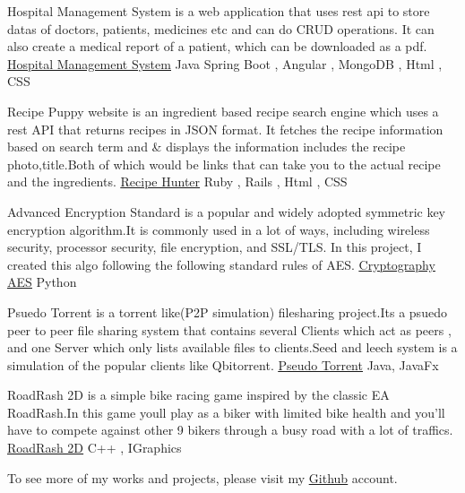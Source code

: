 \documentclass[]{awesome-cv}
\begin{document}
\vspace{-7mm}





\begin{cventries}
	\cventry
	{Hospital Management System is a web application that uses rest api to store datas of doctors, patients, medicines etc and can do CRUD operations. It can also create a medical report of a patient, which can be downloaded as a pdf.}
	{\href{https://github.com/minhaz725/Hospital-Management-System}{\underline{Hospital Management System}}}
	{Java Spring Boot , Angular , MongoDB , Html , CSS}
	{}
	{}
	
	\vspace{-5mm}
	\cventry
	{Recipe Puppy website is an ingredient based recipe search engine which uses a rest API that returns recipes in JSON format. It fetches the recipe information based on search term and \& displays the information includes the recipe photo,title.Both of which would be links that can take you to the actual recipe and the ingredients.}
	{\href{https://github.com/minhaz725/Rails\_Project\_recipe\_puppy\_bootstrap}{\underline{Recipe Hunter}}}
	{Ruby , Rails , Html , CSS}
	{}
	{}
	
	
	\vspace{-5mm}
	\cventry
	{Advanced Encryption Standard is a popular and widely adopted symmetric key encryption algorithm.It is commonly used in a lot of ways, including wireless security, processor security, file encryption, and SSL/TLS. In this project, I created this algo following the following standard rules of AES.}
	{\href{https://github.com/minhaz725/Cryptography-AES}{\underline{Cryptography AES}}}
	{Python}
	{}
	{}
	
	
	\vspace{-5mm}
	\cventry
	{Psuedo Torrent is a torrent like(P2P simulation) filesharing project.It\textquotesingle{}s a psuedo peer to peer file sharing system that contains several \textquotedbl{}Clients\textquotedbl{} which act as peers , and one Server which only lists available files to clients.Seed and leech system is a simulation of the popular clients like Qbitorrent.}
	{\href{https://github.com/minhaz725/Pseudo-Torrent}{\underline{Pseudo Torrent}}}
	{Java, JavaFx}
	{}
	{}
	
	\vspace{-5mm}
	\cventry
	{RoadRash 2D is a simple bike racing game inspired by the classic EA RoadRash.In this game you\textquotesingle{}ll play as a biker with limited bike health and you'll have to compete against other 9 bikers through a busy road with a lot of traffics.}
	{\href{https://github.com/minhaz725/RoadRash2D}{\underline{RoadRash 2D}}}
	{C++ , IGraphics}
	{}
	{}
	
	\vspace{-5mm}
	
	\cventry
	{}
	{To see more of my works and projects, please visit my \href{https://github.com/minhaz725}{\underline{Github}} account. }
	{}
	{}
	{}
	
	\vspace{-5mm}
\end{cventries}

\ 
\end{document}
